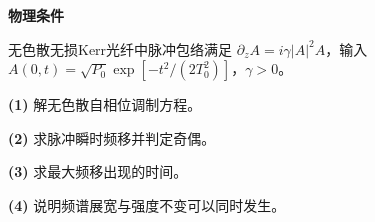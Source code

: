 \textbf{物理条件}\par 无色散无损Kerr光纤中脉冲包络满足 \(\partial_zA=i\gamma|A|^2A\)，输入 \(A(0,t)=\sqrt{P_0}\exp[-t^2/(2T_0^2)]\)，\(\gamma>0\)。
\par\noindent\textbf{(1)} 解无色散自相位调制方程。
\par\noindent\textbf{(2)} 求脉冲瞬时频移并判定奇偶。
\par\noindent\textbf{(3)} 求最大频移出现的时间。
\par\noindent\textbf{(4)} 说明频谱展宽与强度不变可以同时发生。
